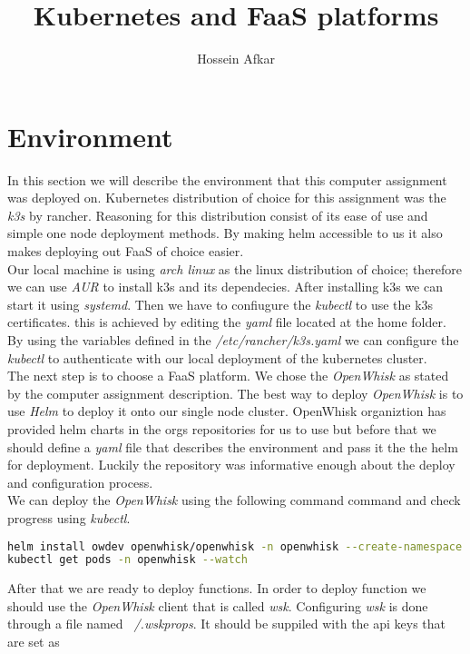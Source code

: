 \documentclass[a4paper, 11pt]{article}
\title{Kubernetes and FaaS platforms}
\author{Hossein Afkar}
\theoremstyle{nonumberplain}
\begin{document}
\maketitle

\section{Environment}
In this section we will describe the environment that this computer assignment
was deployed on.
Kubernetes distribution of choice for this assignment was the \textit{k3s} by
rancher. Reasoning for this distribution consist of its ease of use and simple
one node deployment methods. By making helm accessible to us it also makes
deploying out FaaS of choice easier. \\
Our local machine is using \textit{arch linux} as the linux distribution of
choice; therefore we can use \textit{AUR} to install k3s and its dependecies.
After installing k3s we can start it using \textit{systemd}.
Then we have to confiugure the \textit{kubectl} to use the k3s certificates.
this is achieved by editing the \textit{yaml} file located at the home folder.
By using the variables defined in the \textit{/etc/rancher/k3s.yaml} we can
configure the \textit{kubectl} to authenticate with our local deployment of the
kubernetes cluster. \\
The next step is to choose a FaaS platform. We chose the \textit{OpenWhisk}
as stated by the computer assignment description. The best way to deploy
\textit{OpenWhisk} is to use \textit{Helm} to deploy it onto our single node
cluster. OpenWhisk organiztion has provided helm charts in the orgs
repositories for us to use but before that we should define a \textit{yaml}
file that describes the environment and pass it the the helm for deployment.
Luckily the repository was informative enough about the deploy and
configuration process. \\
We can deploy the \textit{OpenWhisk} using the following command command and
check progress using \textit{kubectl}.
\begin{lstlisting}[language=bash]
helm install owdev openwhisk/openwhisk -n openwhisk --create-namespace -f kube/openwhisk.yml
kubectl get pods -n openwhisk --watch
\end{lstlisting}
After that we are ready to deploy functions.
In order to deploy function we should use the \textit{OpenWhisk} client that is
called \textit{wsk}. Configuring \textit{wsk} is done through a file named
\textit{~/.wskprops}. It should be suppiled with the api keys that are set as
\end{document}
